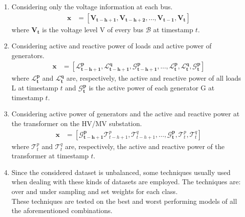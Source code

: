 \begin{enumerate}[label=\textbf{\roman*)}]
    \item \label{onlyV} Considering only the voltage information at each bus.
    \begin{equation}
      \begin{aligned}
        \textbf{x}  &= [\mathbf{V_{t-h+1}}, \mathbf{V_{t-h+2}}, \dots, \mathbf{V_{t-1}}, \mathbf{V_{t}}]
      \end{aligned}
    \end{equation}
    \noindent where $\mathbf{V_t}$ is the voltage level \gls{V} of every bus $\mathcal{B}$ at timestamp $t$.
    
    \item \label{LpqandGp} Considering active and reactive power of loads and active power of generators.
    \begin{equation}
      \begin{aligned}
        \textbf{x}  &= [
            \mathbf{\mathcal{L}^p_{t-h+1}}, \mathbf{\mathcal{L}^q_{t-h+1}}, \mathbf{\mathcal{G}^p_{t-h+1}},
            \dots,
            \mathbf{\mathcal{L}^p_{t}}, 
            \mathbf{\mathcal{L}^q_{t}}, 
            \mathbf{\mathcal{G}^p_{t}}]
      \end{aligned}
    \end{equation}
    \noindent where $\mathbf{\mathcal{L}^p_{t}}$ and $\mathbf{\mathcal{L}^q_{t}}$ are, respectively, the active and reactive power of all loads \gls{L} at timestamp $t$ and $\mathbf{\mathcal{G}^p_{t}}$ is the active power of each generator \gls{G} at timestamp $t$.
    
    \item \label{GpandTpq} Considering active power of generators and the active and reactive power at the transformer on the HV/MV substation.
    \begin{equation}
      \begin{aligned}
        \textbf{x}  &= [
            \mathbf{\mathcal{G}^p_{t-h+1}}
            \mathcal{T}^p_{t-h+1},
            \mathcal{T}^q_{t-h+1}, 
            \dots,
            \mathbf{\mathcal{G}^p_{t}}, 
            \mathcal{T}^p_{t}, 
            \mathcal{T}^q_{t}]
      \end{aligned}
    \end{equation}
    \noindent where $\mathcal{T}^p_{t}$ and $\mathcal{T}^q_{t}$ are, respectively, the active and reactive power of the transformer at timestamp $t$.
    
    \item \label{case4} Since the considered dataset is unbalanced, some techniques usually used when dealing with these kinds of datasets are employed. The techniques are: over and under sampling and set weights for each class.\\
    These techniques are tested on the best and worst performing models of all the aforementioned combinations.
\end{enumerate}
